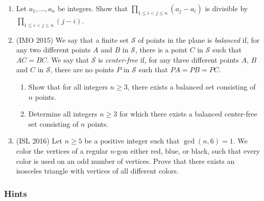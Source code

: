 \documentclass[11pt,paper=letter]{scrartcl}
\begin{document}
\begin{enumerate}
\item Let $a_1, \ldots, a_n$ be integers. Show that $\displaystyle \prod_{1 \le i < j \le n} (a_j - a_i)$ is divisible by $\displaystyle \prod_{1 \le i < j \le n} (j - i)$. \hints{\ref{h:5} \ref{h:6}}

\item (IMO 2015) We say that a finite set $\mathcal{S}$ of points in the plane is \textit{balanced} if, for any two different points $A$ and $B$ in $\mathcal{S}$, there is a point $C$ in $\mathcal{S}$ such that $AC = BC$. We say that $\mathcal{S}$ is \textit{center-free} if, for any three different points $A$, $B$ and $C$ in $\mathcal{S}$, there are no points $P$ in $\mathcal{S}$ such that $PA = PB = PC$.

\begin{enumerate}
  \item Show that for all integers $n \ge 3$, there exists a balanced set consisting of $n$ points.

  \item Determine all integers $n \ge 3$ for which there exists a balanced center-free set consisting of $n$ points. \hints{\ref{h:11} \ref{h:12}}
\end{enumerate}

\item (ISL 2016) Let $n \ge 5$ be a positive integer such that $\gcd(n, 6) = 1$. We color the vertices of a regular $n$-gon either red, blue, or black, such that every color is used on an odd number of vertices. Prove that there exists an isosceles triangle with vertices of all different colors. \hints{\ref{h:13} \ref{h:14}}

\end{enumerate}

\subsubsection*{Hints}
\end{document}
